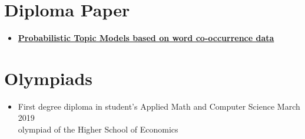 \documentclass[letterpaper,11pt]{article}
\newcommand{\resumeSubHeadingListStart}{\begin{itemize}[leftmargin=*]}
\newcommand{\resumeSubHeadingListEnd}{\end{itemize}}
\begin{document}
\vspace{-23pt}
\section{Diploma Paper}
  \resumeSubHeadingListStart
      \item{
    \textbf{\href{http://www.machinelearning.ru/wiki/images/f/f2/Solotkiy19bsc.pdf}{\color{blue} Probabilistic Topic Models based on word co-occurrence data}}
    }
  \resumeSubHeadingListEnd

\vspace{-23pt}
\section{Olympiads}
  \resumeSubHeadingListStart
      \item{
    		First degree diploma in student's Applied Math and Computer Science
    		\hfill
        March 2019 \\
        olympiad of the Higher School of Economics
      }
  \resumeSubHeadingListEnd

\end{document}
